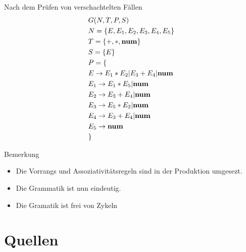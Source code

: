 \documentclass[t]{beamer}
\begin{document}
    \begin{frame}
        \centering
        \begin{minipage}[c]{0.45\textwidth}
            \vspace{-1em}
            \centering
            \begin{block}{Nach dem Prüfen von verschachtelten Fällen}
                \vspace{-2em}
                \begin{align*}
                    & G(N,T,P,S) \\
                    & N= \{E, E_1, E_2, E_3, E_4, E_5\} \\
                    & T= \{+, *, \bold{num}\} \\
                    & S= \{E\} \\
                    & P = \{ \\
                    & E     \rightarrow E_1 * E_2 | E_3 + E_4 | \bold{num} \\
                    & E_1   \rightarrow E_1 * E_5 | \bold{num} \\
                    & E_2   \rightarrow E_3 + E_4 | \bold{num} \\
                    & E_3   \rightarrow E_5 * E_2 | \bold{num} \\
                    & E_4   \rightarrow E_3 + E_4 | \bold{num} \\
                    & E_5   \rightarrow \bold{num} \\
                    & \}
                \end{align*}
            \end{block}
        \end{minipage}%
        \quad\quad%
        \begin{minipage}[c]{0.45\textwidth}
            \vspace{-1em}
            \centering
            \begin{exampleblock}{Bemerkung}
                \begin{itemize}
                    \item Die Vorrangs und Assoziativitätsregeln sind in der Produktion umgesezt.
                    \item Die Grammatik ist nun eindeutig.
                    \item Die Gramatik ist frei von Zykeln
                \end{itemize}
            \end{exampleblock}
        \end{minipage}
    \end{frame}


    \section{Quellen}
    \begin{frame}[allowframebreaks]
        
        
    \end{frame}
\end{document}

